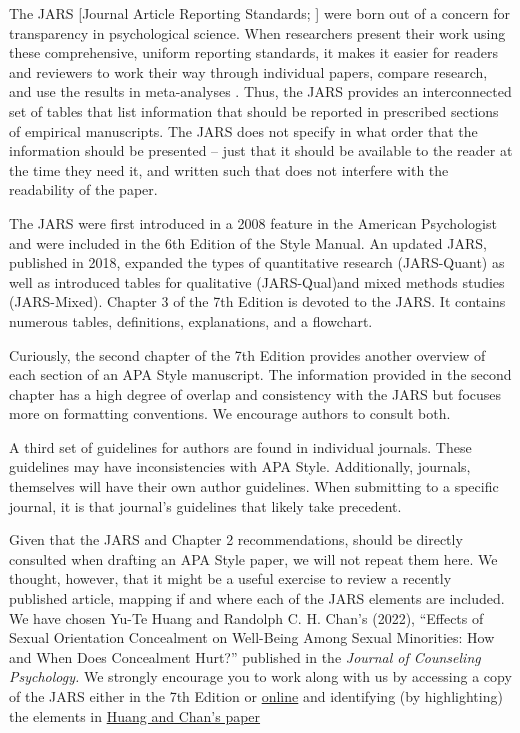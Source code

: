 \documentclass[
  11pt,
]{book}
\begin{document}
The JARS {[}Journal Article Reporting Standards; \citet{appelbaum_journal_2018}{]} were born out of a concern for transparency in psychological science. When researchers present their work using these comprehensive, uniform reporting standards, it makes it easier for readers and reviewers to work their way through individual papers, compare research, and use the results in meta-analyses \citep{american_psychological_association_publication_2020}. Thus, the JARS provides an interconnected set of tables that list information that should be reported in prescribed sections of empirical manuscripts. The JARS does not specify in what order that the information should be presented -- just that it should be available to the reader at the time they need it, and written such that does not interfere with the readability of the paper.

The JARS were first introduced in a 2008 feature in the American Psychologist \citep{noauthor_reporting_2008} and were included in the 6th Edition of the Style Manual. An updated JARS, published in 2018, expanded the types of quantitative research (JARS-Quant) as well as introduced tables for qualitative (JARS-Qual)and mixed methods studies (JARS-Mixed). Chapter 3 of the 7th Edition is devoted to the JARS. It contains numerous tables, definitions, explanations, and a flowchart.

Curiously, the second chapter of the 7th Edition provides another overview of each section of an APA Style manuscript. The information provided in the second chapter has a high degree of overlap and consistency with the JARS but focuses more on formatting conventions. We encourage authors to consult both.

A third set of guidelines for authors are found in individual journals. These guidelines may have inconsistencies with APA Style. Additionally, journals, themselves will have their own author guidelines. When submitting to a specific journal, it is that journal's guidelines that likely take precedent.

Given that the JARS and Chapter 2 recommendations, should be directly consulted when drafting an APA Style paper, we will not repeat them here. We thought, however, that it might be a useful exercise to review a recently published article, mapping if and where each of the JARS elements are included. We have chosen Yu-Te Huang and Randolph C. H. Chan's (2022), ``Effects of Sexual Orientation Concealment on Well-Being Among Sexual Minorities: How and When Does Concealment Hurt?'' published in the \emph{Journal of Counseling Psychology.} We strongly encourage you to work along with us by accessing a copy of the JARS either in the 7th Edition or \href{https://apastyle.apa.org/jars/quantitative}{online} and identifying (by highlighting) the elements in \href{https://pubmed.ncbi.nlm.nih.gov/35696152/}{Huang and Chan's paper}
\end{document}
